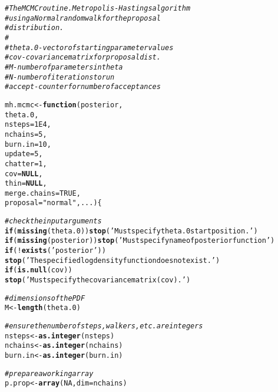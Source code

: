 \documentclass{article}\usepackage[]{graphicx}\usepackage[]{color}
\makeatletter
\newcommand{\hlnum}[1]{\textcolor[rgb]{0.686,0.059,0.569}{#1}}%
\newcommand{\hlstr}[1]{\textcolor[rgb]{0.192,0.494,0.8}{#1}}%
\newcommand{\hlcom}[1]{\textcolor[rgb]{0.678,0.584,0.686}{\textit{#1}}}%
\newcommand{\hlopt}[1]{\textcolor[rgb]{0,0,0}{#1}}%
\newcommand{\hlstd}[1]{\textcolor[rgb]{0.345,0.345,0.345}{#1}}%
\newcommand{\hlkwa}[1]{\textcolor[rgb]{0.161,0.373,0.58}{\textbf{#1}}}%
\newcommand{\hlkwb}[1]{\textcolor[rgb]{0.69,0.353,0.396}{#1}}%
\newcommand{\hlkwc}[1]{\textcolor[rgb]{0.333,0.667,0.333}{#1}}%
\newcommand{\hlkwd}[1]{\textcolor[rgb]{0.737,0.353,0.396}{\textbf{#1}}}%
\newenvironment{kframe}{%
 \def\at@end@of@kframe{}%
 \ifinner\ifhmode%
  \def\at@end@of@kframe{\end{minipage}}%
  \begin{minipage}{\columnwidth}%
 \fi\fi%
 \def\FrameCommand##1{\hskip\@totalleftmargin \hskip-\fboxsep
 \colorbox{shadecolor}{##1}\hskip-\fboxsep
     \hskip-\linewidth \hskip-\@totalleftmargin \hskip\columnwidth}%
 \MakeFramed {\advance\hsize-\width
   \@totalleftmargin\z@ \linewidth\hsize
   \@setminipage}}%
 {\par\unskip\endMakeFramed%
 \at@end@of@kframe}
\newenvironment{knitrout}{}{} %
\makeatother
\begin{document}
\begin{knitrout}
\color{fgcolor}\begin{kframe}
\begin{alltt}
\hlcom{# The MCMC routine. Metropolis-Hastings algorithm}
\hlcom{# using a Normal random walk for the proposal }
\hlcom{# distribution.}
\hlcom{#}
\hlcom{#  theta.0 - vector of starting parameter values}
\hlcom{#  cov     - covariance matrix for proposal dist.}
\hlcom{#  M       - number of parameters in theta}
\hlcom{#  N       - number of iterations to run}
\hlcom{#  accept  - counter for number of acceptances}

\hlstd{mh.mcmc} \hlkwb{<-} \hlkwa{function}\hlstd{(}\hlkwc{posterior}\hlstd{,}
                   \hlkwc{theta.0}\hlstd{,}
                   \hlkwc{nsteps} \hlstd{=} \hlnum{1E4}\hlstd{,}
                   \hlkwc{nchains} \hlstd{=} \hlnum{5}\hlstd{,}
                   \hlkwc{burn.in} \hlstd{=} \hlnum{10}\hlstd{,}
                   \hlkwc{update} \hlstd{=} \hlnum{5}\hlstd{,}
                   \hlkwc{chatter} \hlstd{=} \hlnum{1}\hlstd{,}
                   \hlkwc{cov} \hlstd{=} \hlkwa{NULL}\hlstd{,}
                   \hlkwc{thin} \hlstd{=} \hlkwa{NULL}\hlstd{,}
                   \hlkwc{merge.chains} \hlstd{=} \hlnum{TRUE}\hlstd{,}
                   \hlkwc{proposal} \hlstd{=} \hlstr{"normal"}\hlstd{,} \hlkwc{...}\hlstd{) \{}

  \hlcom{# check the input arguments}
  \hlkwa{if} \hlstd{(}\hlkwd{missing}\hlstd{(theta.0))} \hlkwd{stop}\hlstd{(}\hlstr{'Must specify theta.0 start position.'}\hlstd{)}
  \hlkwa{if} \hlstd{(}\hlkwd{missing}\hlstd{(posterior))} \hlkwd{stop}\hlstd{(}\hlstr{'Must specify name of posterior function'}\hlstd{)}
  \hlkwa{if} \hlstd{(}\hlopt{!}\hlkwd{exists}\hlstd{(}\hlstr{'posterior'}\hlstd{))}
    \hlkwd{stop}\hlstd{(}\hlstr{'The specified log density function does not exist.'}\hlstd{)}
  \hlkwa{if} \hlstd{(}\hlkwd{is.null}\hlstd{(cov))}
    \hlkwd{stop}\hlstd{(}\hlstr{'Must specify the covariance matrix (cov).'}\hlstd{)}

  \hlcom{# dimensions of the PDF}
  \hlstd{M} \hlkwb{<-} \hlkwd{length}\hlstd{(theta.0)}

  \hlcom{# ensure the number of steps, walkers, etc. are integers  }
  \hlstd{nsteps} \hlkwb{<-} \hlkwd{as.integer}\hlstd{(nsteps)}
  \hlstd{nchains} \hlkwb{<-} \hlkwd{as.integer}\hlstd{(nchains)}
  \hlstd{burn.in} \hlkwb{<-} \hlkwd{as.integer}\hlstd{(burn.in)}

  \hlcom{# prepare a working array}
  \hlstd{p.prop} \hlkwb{<-} \hlkwd{array}\hlstd{(}\hlnum{NA}\hlstd{,} \hlkwc{dim} \hlstd{= nchains)}


\end{alltt}
\end{kframe}
\end{knitrout}
\end{document}
